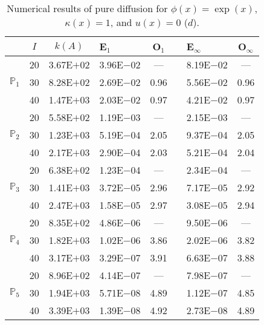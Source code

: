 \begin{table}[H]
\centering
\caption{Numerical results of pure diffusion for $\phi(x)=\exp(x)$, $\kappa(x)=1$, and $u(x)=0$ ($d$).}
\begin{tabular}{@{}l c c l c c l c@{}}
\toprule
 & $I$ & $k(A)$ & E$_1$ & O$_1$ && E$_{\infty}$ & O$_{\infty}$\\
\midrule
\multirow{3}{*}{$\mathbb{P}_{1}$}
 & 20 & 3.67E$+$02 & 3.96E$-$02 & --- && 8.19E$-$02 & ---\\
 & 30 & 8.28E$+$02 & 2.69E$-$02 & 0.96 && 5.56E$-$02 & 0.96\\
 & 40 & 1.47E$+$03 & 2.03E$-$02 & 0.97 && 4.21E$-$02 & 0.97\\
\midrule
\multirow{3}{*}{$\mathbb{P}_{2}$}
 & 20 & 5.58E$+$02 & 1.19E$-$03 & --- && 2.15E$-$03 & ---\\
 & 30 & 1.23E$+$03 & 5.19E$-$04 & 2.05 && 9.37E$-$04 & 2.05\\
 & 40 & 2.17E$+$03 & 2.90E$-$04 & 2.03 && 5.21E$-$04 & 2.04\\
\midrule
\multirow{3}{*}{$\mathbb{P}_{3}$}
 & 20 & 6.38E$+$02 & 1.23E$-$04 & --- && 2.34E$-$04 & ---\\
 & 30 & 1.41E$+$03 & 3.72E$-$05 & 2.96 && 7.17E$-$05 & 2.92\\
 & 40 & 2.47E$+$03 & 1.58E$-$05 & 2.97 && 3.08E$-$05 & 2.94\\
\midrule
\multirow{3}{*}{$\mathbb{P}_{4}$}
 & 20 & 8.35E$+$02 & 4.86E$-$06 & --- && 9.50E$-$06 & ---\\
 & 30 & 1.82E$+$03 & 1.02E$-$06 & 3.86 && 2.02E$-$06 & 3.82\\
 & 40 & 3.17E$+$03 & 3.29E$-$07 & 3.91 && 6.63E$-$07 & 3.88\\
\midrule
\multirow{3}{*}{$\mathbb{P}_{5}$}
 & 20 & 8.96E$+$02 & 4.14E$-$07 & --- && 7.98E$-$07 & ---\\
 & 30 & 1.94E$+$03 & 5.71E$-$08 & 4.89 && 1.12E$-$07 & 4.85\\
 & 40 & 3.39E$+$03 & 1.39E$-$08 & 4.92 && 2.73E$-$08 & 4.89\\
\bottomrule
\end{tabular}
\end{table}